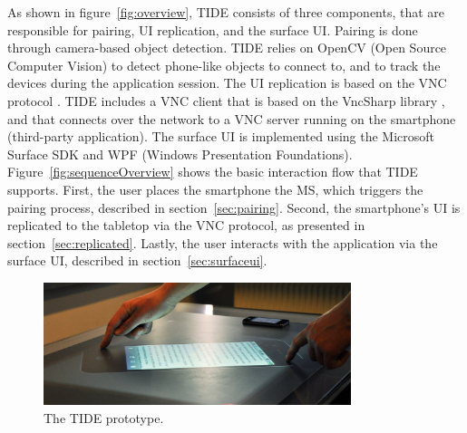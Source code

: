 As shown in figure~\ref{fig:overview}, TIDE consists of three components, that are responsible for pairing, UI replication, and the surface UI.
Pairing is done through camera-based object detection.
TIDE relies on OpenCV (Open Source Computer Vision) \citep{opencv} to detect phone-like objects to connect to, and to track the devices during the application session.
The UI replication is based on the VNC protocol \citep{Richardson:1998:vnc}.
TIDE includes a VNC client that is based on the VncSharp library \citep{vncsharp}, and that connects over the network to a VNC server running on the smartphone (third-party application).
The surface UI is implemented using the Microsoft Surface SDK and WPF (Windows Presentation Foundations).
\\
\linebreak
Figure~\ref{fig:sequenceOverview} shows the basic interaction flow that TIDE supports.
First, the user places the smartphone the MS, which triggers the pairing process, described in section~\ref{sec:pairing}.
Second, the smartphone's UI is replicated to the tabletop via the VNC protocol, as presented in section~\ref{sec:replicated}.
Lastly, the user interacts with the application via the surface UI, described in section~\ref{sec:surfaceui}.

\begin{figure}[htb]
  \centering
    \includegraphics[width=0.8\textwidth]{images/tideHands}
    \caption{The TIDE prototype.}
    \label{fig:tideHands}
\end{figure}


